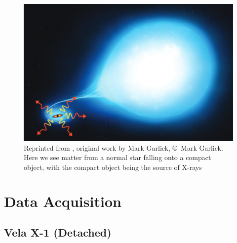 \documentclass[12pt, a4paper]{article}
\begin{document}
            \begin{figure} [H]
                \centering
                \includegraphics[width=\textwidth]{figs/reused-figs/markGarlic-Xrayaccretion.png}
                \caption{Reprinted from \parencite{TaurisvandenHeuvel+2023}, original work by Mark Garlick, \copyright~Mark Garlick. Here we see matter from a normal star falling onto a compact object, with the compact object being the source of X-rays}
                \label{XrayAccretionMarkVis}
            \end{figure}
        
\section{Data Acquisition}
    \subsection{Vela X-1 (Detached)} \label{velax1introduction}
    
\end{document}
